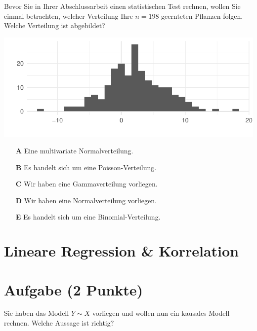 \documentclass[a4paper, 9pt]{scrartcl}\usepackage[]{graphicx}\usepackage[]{xcolor}
\makeatletter
\def\maxwidth{ %
  \ifdim\Gin@nat@width>\linewidth
    \linewidth
  \else
    \Gin@nat@width
  \fi
}
\makeatother
\begin{document}
Bevor Sie in Ihrer Abschlussarbeit einen statistischen Test rechnen, wollen Sie einmal betrachten, welcher Verteilung Ihre $n = 198$ geernteten Pflanzen folgen.  Welche Verteilung ist abgebildet?



{\centering \includegraphics[width=\maxwidth]{img/mc-distribution-02-a-1} 

}







\begin{enumerate}
\item [\textbf{A} \msquare] Eine multivariate Normalverteilung.
\item [\textbf{B} \msquare] Es handelt sich um eine Poisson-Verteilung.
\item [\textbf{C} \msquare] Wir haben eine Gammaverteilung vorliegen.
\item [\textbf{D} \msquare] Wir haben eine Normalverteilung vorliegen.
\item [\textbf{E} \msquare] Es handelt sich um eine Binomial-Verteilung.
\end{enumerate} 
\section*{Lineare Regression \& Korrelation}

\section{Aufgabe \hfill (2 Punkte)}



Sie haben das Modell $Y \sim X$ vorliegen und wollen nun ein kausales Modell rechnen. Welche Aussage ist richtig?
\end{document}
